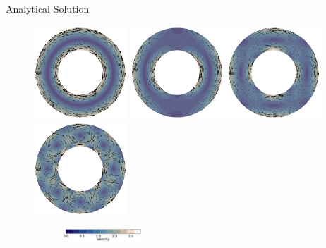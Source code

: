 \documentclass[10pt,aspectratio=169]{beamer}
\begin{document}
\begin{frame}{Analytical Solution}
	\vspace{-0.32in}
	\begin{figure}[!htb]
		\begin{multicols}{4}
			\includegraphics[width=3.5cm]{./model_k_0_res_32_vdeg_2_pdeg_1_pcont_True_vel_penalty_1.0e+08_stokes_tol_1.0e-10/vel_ana.png}\par
			\hspace{0.75in}
			\includegraphics[width=3.5cm]{./model_k_1_res_32_vdeg_2_pdeg_1_pcont_True_vel_penalty_1.0e+08_stokes_tol_1.0e-10/vel_ana.png}\par
			\hspace{1.5in}
			\includegraphics[width=3.5cm]{./model_k_2_res_32_vdeg_2_pdeg_1_pcont_True_vel_penalty_1.0e+08_stokes_tol_1.0e-10/vel_ana.png}\par
			\hspace{2.25in}
			\includegraphics[width=3.5cm]{./model_k_4_res_32_vdeg_2_pdeg_1_pcont_True_vel_penalty_1.0e+08_stokes_tol_1.0e-10/vel_ana.png}
		\end{multicols}
		\vspace{-0.29in}
		\begin{figure}
			\hspace{0.1in} 
			\includegraphics[width=3cm]{./model_k_0_res_32_vdeg_2_pdeg_1_pcont_True_vel_penalty_1.0e+08_stokes_tol_1.0e-10/v_ana_cbhorz.pdf}
		\end{figure}
	\end{figure}
	

\end{frame}
\end{document}
